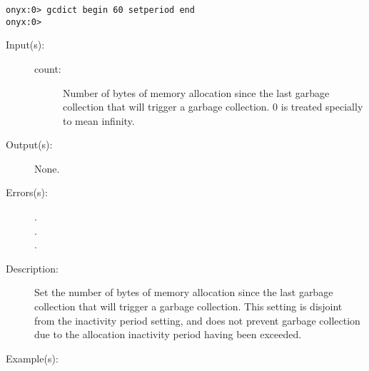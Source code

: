 \begin{description}
\begin{description}
\begin{verbatim}
onyx:0> gcdict begin 60 setperiod end
onyx:0>
		\end{verbatim}
	\end{description}
\label{gcdict:setthreshold}
\item[{\onyxop{count}{setthreshold}{--}}: ]
	\begin{description}\item[]
	\item[Input(s): ]
		\begin{description}\item[]
		\item[count: ]
			Number of bytes of memory allocation since the last
			garbage collection that will trigger a garbage
			collection.  0 is treated specially to mean infinity.
		\end{description}
	\item[Output(s): ] None.
	\item[Errors(s): ]
		\begin{description}\item[]
		\item[.]
		\item[.]
		\item[.]
		\end{description}
	\item[Description: ]
		Set the number of bytes of memory allocation since the last
		garbage collection that will trigger a garbage collection.  This
		setting is disjoint from the inactivity period setting, and does
		not prevent garbage collection due to the allocation inactivity
		period having been exceeded.
	\item[Example(s): ]\begin{verbatim}


\end{verbatim}
\end{description}
\end{description}
